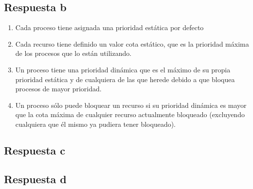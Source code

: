 \subsection{Respuesta b}

\begin{enumerate}
	\item Cada proceso tiene asignada una prioridad estática por defecto
	\item Cada recurso tiene definido un valor cota estático, que es la
		prioridad máxima de los procesos que lo están utilizando.
	\item Un proceso tiene una prioridad dinámica que es el máximo de su
		propia prioridad estática y de cualquiera de las que herede
		debido a que bloquea procesos de mayor prioridad.
	\item Un proceso sólo puede bloquear un recurso si su prioridad dinámica
		es mayor que la cota máxima de cualquier recurso actualmente
		bloqueado (excluyendo cualquiera que él mismo ya pudiera tener
		bloqueado).
\end{enumerate}

\subsection{Respuesta c}

\subsection{Respuesta d}

